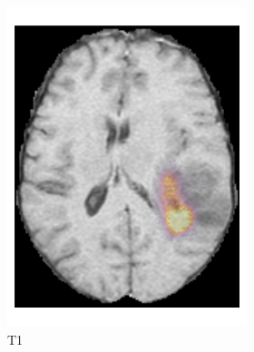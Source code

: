 \begin{figure}[htbp]
    \centering
    \begin{subfigure}[b]{\textwidth}
        \centering

        \hfill
        \begin{subfigure}[b]{0.24\textwidth}
        \includegraphics[width=\textwidth]{Figures/saliency_LGG_T1.png}
        \caption*{\acrshort{T1}\nopunct}
        \end{subfigure}
        \hfill
        \begin{subfigure}[b]{0.24\textwidth}

\end{subfigure}
\end{subfigure}
\end{figure}
